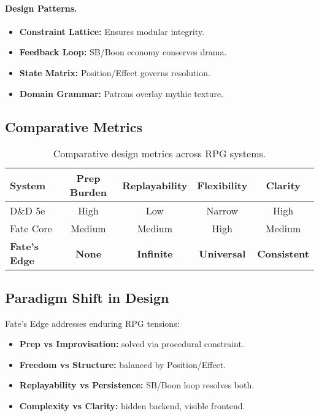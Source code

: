\paragraph{Design Patterns.}
\begin{itemize}
  \item \textbf{Constraint Lattice:} Ensures modular integrity.  
  \item \textbf{Feedback Loop:} SB/Boon economy conserves drama.  
  \item \textbf{State Matrix:} Position/Effect governs resolution.  
  \item \textbf{Domain Grammar:} Patrons overlay mythic texture.  
\end{itemize}

\subsection{Comparative Metrics}

\begin{table}[H]
\centering
\renewcommand{\arraystretch}{1.2}
\begin{tabular}{lcccc}
\toprule
\textbf{System} & \textbf{Prep Burden} & \textbf{Replayability} & \textbf{Flexibility} & \textbf{Clarity} \\
\midrule
D\&D 5e & High & Low & Narrow & High \\
Fate Core & Medium & Medium & High & Medium \\
\textbf{Fate’s Edge} & \textbf{None} & \textbf{Infinite} & \textbf{Universal} & \textbf{Consistent} \\
\bottomrule
\end{tabular}
\caption{Comparative design metrics across RPG systems.}
\label{tab:comparative-metrics}
\end{table}

\subsection{Paradigm Shift in Design}

Fate’s Edge addresses enduring RPG tensions:
\begin{itemize}
  \item \textbf{Prep vs Improvisation:} solved via procedural constraint.  
  \item \textbf{Freedom vs Structure:} balanced by Position/Effect.  
  \item \textbf{Replayability vs Persistence:} SB/Boon loop resolves both.  
  \item \textbf{Complexity vs Clarity:} hidden backend, visible frontend.  
\end{itemize}

